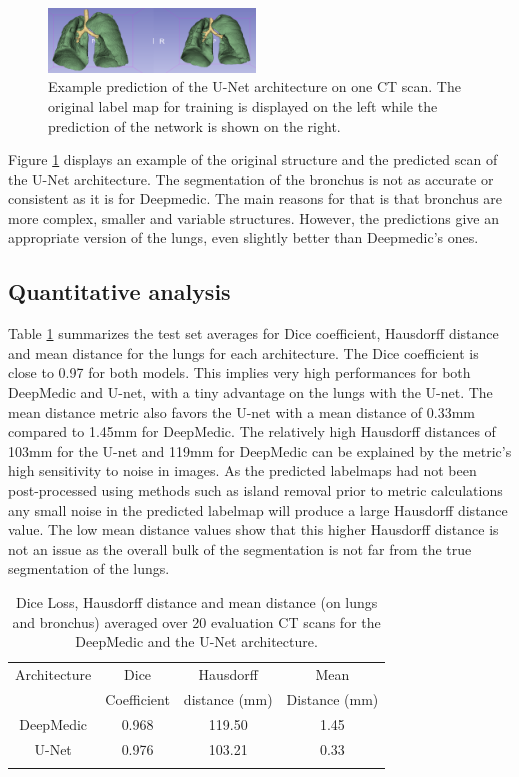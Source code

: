 \begin{figure}[h!]
	\includegraphics[width=0.49\textwidth, angle=0]{files/predunet.png}
	\caption{Example prediction of the U-Net architecture on one CT scan. The original label map for training is displayed on the left while the prediction of the network is shown on the right.}
	\label{pred_unet}
\end{figure}

Figure \ref{pred_unet} displays an example of the original structure and the predicted scan of the U-Net architecture. The segmentation of the bronchus is not as accurate or consistent as it is for Deepmedic. The main reasons for that is that bronchus are more complex, smaller and variable structures. However, the predictions give an appropriate version of the lungs, even slightly better than Deepmedic's ones.\newline

\subsection{Quantitative analysis}

Table \ref{table_result} summarizes the test set averages for Dice coefficient, Hausdorff distance and mean distance for the lungs for each architecture. The Dice coefficient is close to 0.97 for both models. This implies very high performances for both DeepMedic and U-net, with a tiny advantage on the lungs with the U-net. The mean distance metric also favors the U-net with a mean distance of 0.33mm compared to 1.45mm for DeepMedic.
The relatively high Hausdorff distances of 103mm for the U-net and 119mm for DeepMedic can be explained by the metric's high sensitivity to noise in images. As the predicted labelmaps had not been post-processed using methods such as island removal prior to metric calculations any small noise in the predicted labelmap will produce a large Hausdorff distance value. The low mean distance values show that this higher Hausdorff distance is not an issue as the overall bulk of the segmentation is not far from the true segmentation of the lungs.

\begin{table}[h!]
	\caption{Dice Loss, Hausdorff distance and mean distance (on lungs and bronchus) averaged over 20 evaluation CT scans for the DeepMedic and the U-Net architecture.}
	\label{table_result}
	\centering
	\setlength{\tabcolsep}{10pt}
	\renewcommand{\arraystretch}{1.5}
	\begin{tabular}{c c c c}
		\hline 
		Architecture & Dice & Hausdorff & Mean \\
		& Coefficient & distance (mm) & Distance (mm) \\ 
		\hline 
		DeepMedic & 0.968 & 119.50 & 1.45 \\ 
		U-Net & 0.976 & 103.21 & 0.33 \\ 
		\hline
		\newline 
	\end{tabular}

\end{table}
